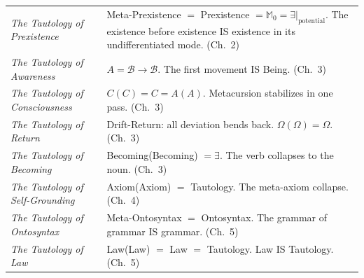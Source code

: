 \documentclass[10pt, openany, oneside]{book}
\begin{document}
{\begin{tabular}{@{} p{} @{\hspace{0.5em}} p{} @{}}
\textit{The Tautology of Prexistence} & Meta-Prexistence $=$ Prexistence $= \mathbb{M}_0 = \exists|_{\text{potential}}$. The existence before existence IS existence in its undifferentiated mode. (Ch.\ 2) \\[0.3em]

\textit{The Tautology of Awareness} & $A = \mathcal{B} \to \mathcal{B}$. The first movement IS Being. (Ch.\ 3) \\[0.3em]

\textit{The Tautology of Consciousness} & $C(C) = C = A(A)$. Metacursion stabilizes in one pass. (Ch.\ 3) \\[0.3em]

\textit{The Tautology of Return} & Drift-Return: all deviation bends back. $\Omega(\Omega) = \Omega$. (Ch.\ 3) \\[0.3em]

\textit{The Tautology of Becoming} & Becoming(Becoming) $= \exists$. The verb collapses to the noun. (Ch.\ 3) \\[0.3em]

\textit{The Tautology of Self-Grounding} & Axiom(Axiom) $=$ Tautology. The meta-axiom collapse. (Ch.\ 4) \\[0.3em]

\textit{The Tautology of Ontosyntax} & Meta-Ontosyntax $=$ Ontosyntax. The grammar of grammar IS grammar. (Ch.\ 5) \\[0.3em]

\textit{The Tautology of Law} & Law(Law) $=$ Law $=$ Tautology. Law IS Tautology. (Ch.\ 5) \\[0.3em]

\end{tabular}
}
\end{document}
